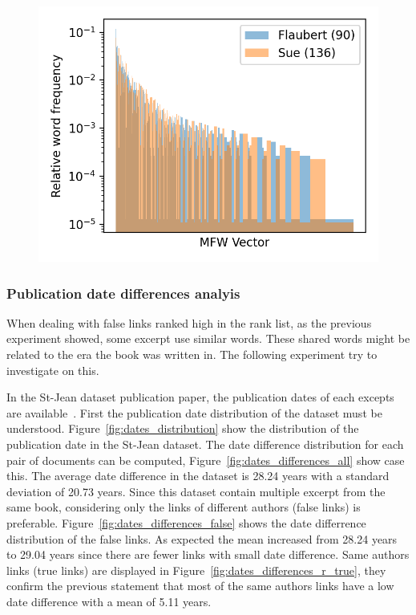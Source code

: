 \begin{figure}
  \label{fig:mfw_vector_last_rl}
  \includegraphics[width=\linewidth]{img/mfw_vector_last_rl.png}
\end{figure}

\subsubsection{Publication date differences analyis}

When dealing with false links ranked high in the rank list, as the previous experiment showed, some excerpt use similar words.
These shared words might be related to the era the book was written in.
The following experiment try to investigate on this.

In the St-Jean dataset publication paper, the publication dates of each excepts are available~\cite{st_jean}.
First the publication date distribution of the dataset must be understood.
Figure~\ref{fig:dates_distribution} show the distribution of the publication date in the St-Jean dataset.
The date difference distribution for each pair of documents can be computed, Figure~\ref{fig:dates_differences_all} show case this.
The average date difference in the dataset is 28.24 years with a standard deviation of 20.73 years.
Since this dataset contain multiple excerpt from the same book, considering only the links of different authors (false links) is preferable.
Figure~\ref{fig:dates_differences_false} shows the date differrence distribution of the false links.
As expected the mean increased from 28.24 years to 29.04 years since there are fewer links with small date difference.
Same authors links (true links) are displayed in Figure~\ref{fig:dates_differences_r_true}, they confirm the previous statement that most of the same authors links have a low date difference with a mean of 5.11 years.

